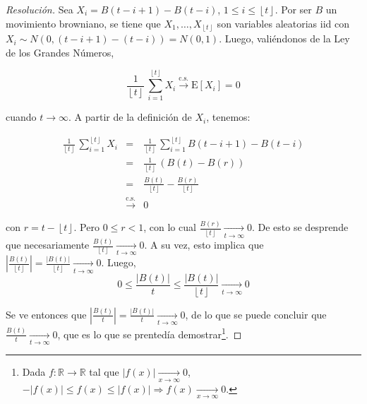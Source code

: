 \documentclass[a4paper,11pt]{article}
\newcommand{\floor}[1]{\ensuremath{\left\lfloor #1 \right\rfloor}}
\begin{document}
\begin{proof}[Resoluci\'on]
Sea $X_i = B(t - i + 1) - B(t - i)$, $1 \leq i \leq \floor{t}$. Por ser $B$ un
movimiento browniano, se tiene que $X_1,\dots,X_{\floor{t}}$ son variables
aleatorias iid con $X_i \sim N(0, (t - i + 1) - (t-i)) = N(0,1)$. Luego,
valiéndonos de la Ley de los Grandes Números,

$$\frac{1}{\floor{t}} \, \sum_{i = 1}^{\floor{t}}{X_i}
    \stackrel{\textrm{c.s.}}{\longrightarrow} \textrm{E}[X_i] = 0$$

cuando $t \rightarrow \infty$. A partir de la definición de $X_i$, tenemos:

\begin{eqnarray*}
    \frac{1}{\floor{t}} \, \sum_{i = 1}^{\floor{t}}{X_i} 
    &=& \frac{1}{\floor{t}} \, \sum_{i = 1}^{\floor{t}}{B(t - i + 1) - B(t - i)} \\
    &=& \frac{1}{\floor{t}} \, \left(B(t) - B(r)\right) \\
    &=& \frac{B(t)}{\floor{t}} - \frac{B(r)}{\floor{t}} \\
    &\stackrel{\textrm{c.s.}}{\longrightarrow}& 0
\end{eqnarray*}

con $r = t - \floor{t}$. Pero $0 \leq r < 1$, con lo cual
$\frac{B(r)}{\floor{t}} \underset{t \to \infty}{\longrightarrow} 0$. 
De esto se desprende que necesariamente
$\frac{B(t)}{\floor{t}} \underset{t \to \infty}{\longrightarrow} 0$.
A su vez, esto implica que
$\left| \frac{B(t)}{\floor{t}} \right| =
\frac{\left|B(t)\right|}{\floor{t}}
\underset{t \to \infty}{\longrightarrow} 0$. Luego,
$$0 \leq \frac{\left|B(t)\right|}{t} \leq 
\frac{\left|B(t)\right|}{\floor{t}} \underset{t \to \infty}{\longrightarrow} 0$$

Se ve entonces que 
$\left| \frac{B(t)}{t} \right| =
\frac{|B(t)|}{t} \underset{t \to \infty}{\longrightarrow} 0$, de lo que se
puede concluir que $\frac{B(t)}{t} \underset{t \to \infty}{\longrightarrow} 0$,
que es lo que se prentedía demostrar\footnote
{Dada $f : \mathbb{R} \to \mathbb{R}$ tal que $|f(x)|
\underset{x \to \infty}{\longrightarrow} 0$,
$-|f(x)| \leq f(x) \leq |f(x)| \Rightarrow
f(x) \underset{x \to \infty}{\longrightarrow} 0$.}.


\end{proof}
\end{document}

